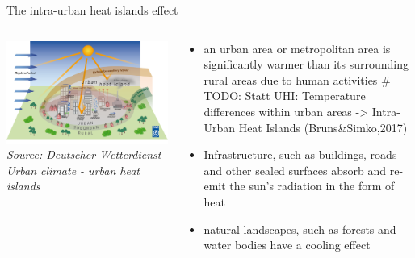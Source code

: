 \begin{frame}{The intra-urban heat islands effect}
	\begin{columns}[T] %
		\begin{column}{.52\textwidth}
			\includegraphics[width=\linewidth]{../writeup/images/urbanheatisland_01.png}\\
			\textit{\footnotesize Source: Deutscher Wetterdienst\\Urban climate - urban heat islands}
		\end{column}%
		\hfill%
		\begin{column}{.48\textwidth}
			\begin{itemize}
				\item \glqq{}{[\textellipsis]} an urban area or metropolitan area is significantly warmer than its surrounding rural areas due to human activities\grqq{}\cite{takebayashi_chapter_2020}
				# TODO: Statt UHI: Temperature differences within urban areas -> Intra-Urban Heat Islands (Bruns&Simko,2017)
				\item Infrastructure, such as buildings, roads and other sealed surfaces absorb and re-emit the sun's radiation in the form of heat
				\item natural landscapes, such as forests and water bodies have a cooling effect\cite{us_epa_learn_2014}
			\end{itemize}
		\end{column}%
	\end{columns}
\end{frame}
